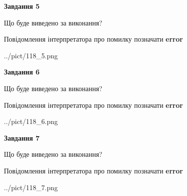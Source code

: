 \documentclass[10pt, ukrainian]{article}
\begin{document}
{\begin {large}
{\begin {center}\textbf{Завдання 5}\end {center}}\par
Що буде виведено за виконання? \par
Повідомлення інтерпретатора про помилку позначати \textbf{error}

\begin{center}
	{../pict/118_5.png}
\end{center}
\newpage

{\begin {center}\textbf{Завдання 6}\end {center}}\par
Що буде виведено за виконання? \par
Повідомлення інтерпретатора про помилку позначати \textbf{error}

\begin{center}
	{../pict/118_6.png}
\end{center}
\newpage

{\begin {center}\textbf{Завдання 7}\end {center}}\par
Що буде виведено за виконання? \par
Повідомлення інтерпретатора про помилку позначати \textbf{error}

\begin{center}
	{../pict/118_7.png}
\end{center}
\newpage

\end {large}}
\end{document}
